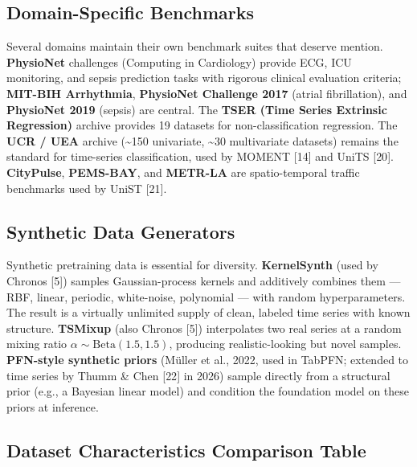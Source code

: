 \documentclass{article}
\begin{document}
\subsection{Domain-Specific Benchmarks}\label{domain-specific-benchmarks}

Several domains maintain their own benchmark suites that deserve mention. \textbf{PhysioNet} challenges (Computing in Cardiology) provide ECG, ICU monitoring, and sepsis prediction tasks with rigorous clinical evaluation criteria; \textbf{MIT-BIH Arrhythmia}, \textbf{PhysioNet Challenge 2017} (atrial fibrillation), and \textbf{PhysioNet 2019} (sepsis) are central. The \textbf{TSER (Time Series Extrinsic Regression)} archive provides 19 datasets for non-classification regression. The \textbf{UCR / UEA} archive (\textasciitilde150 univariate, \textasciitilde30 multivariate datasets) remains the standard for time-series classification, used by MOMENT {[}14{]} and UniTS {[}20{]}. \textbf{CityPulse}, \textbf{PEMS-BAY}, and \textbf{METR-LA} are spatio-temporal traffic benchmarks used by UniST {[}21{]}.

\subsection{Synthetic Data Generators}\label{synthetic-data-generators}

Synthetic pretraining data is essential for diversity. \textbf{KernelSynth} (used by Chronos {[}5{]}) samples Gaussian-process kernels and additively combines them --- RBF, linear, periodic, white-noise, polynomial --- with random hyperparameters. The result is a virtually unlimited supply of clean, labeled time series with known structure. \textbf{TSMixup} (also Chronos {[}5{]}) interpolates two real series at a random mixing ratio \(\alpha \sim \mathrm{Beta}(1.5, 1.5)\), producing realistic-looking but novel samples. \textbf{PFN-style synthetic priors} (Müller et al., 2022, used in TabPFN; extended to time series by Thumm \& Chen {[}22{]} in 2026) sample directly from a structural prior (e.g., a Bayesian linear model) and condition the foundation model on these priors at inference.

\subsection{Dataset Characteristics Comparison Table}\label{dataset-characteristics-comparison-table}
\end{document}
